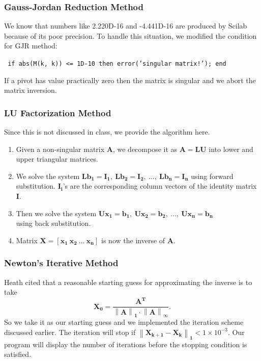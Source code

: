 \documentclass[a4paper]{article}
\begin{document}
			\subsubsection{Gauss-Jordan Reduction Method}
			We know that numbers like 2.220D-16 and -4.441D-16 are produced by Scilab because of its poor precision.
			To handle this situation, we modified the condition for GJR method:
			\begin{center}
				\texttt{
				if abs(M(k, k)) <= 1D-10 then
				error('singular matrix!');
				end
				}
			\end{center}
			If a pivot has value practically zero then the matrix is singular and we abort the matrix inversion.
			\subsubsection{LU Factorization Method}
			Since this is not discussed in class, we provide the algorithm here.
			\begin{enumerate}
				\item Given a non-singular matrix $\mathbf{A}$, we decompose it as $\mathbf{A=LU}$ into lower and upper triangular matrices.
				\item We solve the system $\mathbf{Lb_{1}=I_{1}, \:Lb_{2}=I_{2}, \:... ,\: Lb_{n}=I_{n}}$ using forward substitution.
						$\mathbf{I_{i}}$'s are the corresponding column vectors of the identity matrix $\mathbf{I}$.
				\item Then we solve the system $\mathbf{Ux_{1}=b_{1}, \:Ux_{2}=b_{2},\: ... ,\: Ux_{n}=b_{n}}$\\ using back substitution.
				\item Matrix $\mathbf{X=[x_{1}\:x_{2}\:...\:x_{n}]}$ is now the inverse of $\mathbf{A}$.
			\end{enumerate}
			\subsubsection{Newton's Iterative Method}
			Heath cited that a reasonable starting guess for approximating the inverse is to take
			$$\mathbf{
				X_{0}=\frac{A^{T}}{\left\|A\right\|_{1}\cdot\left\|A\right\|_{\infty}}.
			}$$
			So we take it as our starting guess and we implemented the iteration scheme discussed earlier.
			The iteration will stop if $\mathbf{\left\|X_{k+1}-X_{k}\right\|_{1}}<1\times{}10^{-3}$.
			Our program will display the number of iterations before the stopping condition is satisfied.
			
\end{document}
